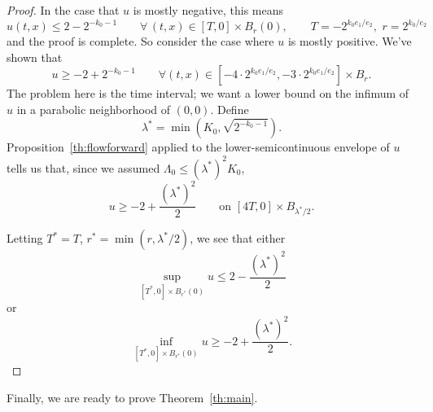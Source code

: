 \begin{proof}
In the case that $u$ is mostly negative, this means
\[ u(t,x) \leq 2 - 2^{-k_0-1} \qquad \forall \, (t,x) \in [T,0] \times B_{r}(0), \qquad T= -2^{k_0 e_1 / e_2}, \,\, r = 2^{k_0 / e_2} \]
and the proof is complete.  So consider the case where $u$ is mostly positive.  We've shown that
\[ u \geq -2 + 2^{-k_0-1} \qquad \forall (t,x) \in [-4 \cdot 2^{k_0 e_1 / e_2}, -3 \cdot 2^{k_0 e_1 / e_2}]\times B_r.\]
The problem here is the time interval; we want a lower bound on the infimum of $u$ in a parabolic neighborhood of $(0,0)$.  Define 
\[ \lambda^* = \min(K_0, \sqrt{2^{-k_0-1}}). \]
Proposition~\ref{th:flowforward} applied to the lower-semicontinuous envelope of $u$ tells us that, since we assumed $\Lambda_0 \leq (\lambda^*)^2 K_0$,  
\[ u \geq -2 + \frac{(\lambda^*)^2}{2} \qquad \textrm{on } [4T,0] \times B_{\lambda^*/2}.\] 

Letting $T^* = T$, $r^* = \min(r, \lambda^*/2)$, we see that either
\[ \sup_{[T^*,0]\times B_{r^*}(0)} u \leq 2 - \frac{(\lambda^*)^2}{2}\]
or
\[ \inf_{[T^*,0]\times B_{r^*}(0)} u \geq -2 + \frac{(\lambda^*)^2}{2}.\]  



\end{proof}


Finally, we are ready to prove Theorem~\ref{th:main}.  

